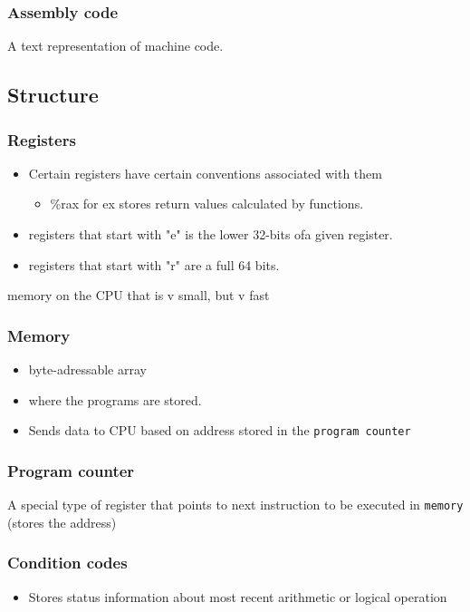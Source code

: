 \documentclass[11pt]{article}
\begin{document}
\subsubsection{Assembly code}
\label{sec-5-4-2}
A text representation of machine code.
\subsection{Structure}
\label{sec-5-5}
\subsubsection{Registers}
\label{sec-5-5-1}
\begin{itemize}
\item Certain registers have certain conventions associated with them
\begin{itemize}
\item \%rax for ex stores return values calculated by functions.
\end{itemize}
\item registers that start with "e" is the lower 32-bits ofa given register.
\item registers that start with "r" are a full 64 bits.
\end{itemize}
memory on the CPU that is v small, but v fast 
\subsubsection{Memory}
\label{sec-5-5-2}
\begin{itemize}
\item byte-adressable array
\item where the programs are stored.
\item Sends data to CPU based on address stored in the \texttt{program counter}
\end{itemize}

\subsubsection{Program counter}
\label{sec-5-5-3}
A special type of register that points to next instruction to be executed 
in \texttt{memory} (stores the address)
\subsubsection{Condition codes}
\label{sec-5-5-4}
\begin{itemize}
\item Stores status information about most recent arithmetic or logical operation
\end{itemize}
\end{document}
